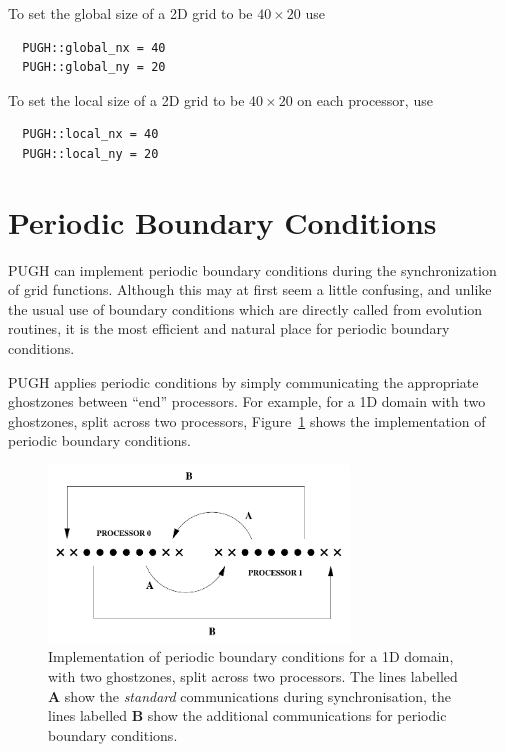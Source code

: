 \documentclass{article}
\begin{document}
To set the global size of a 2D grid to be $40\times 20$ use

\begin{verbatim}
  PUGH::global_nx = 40
  PUGH::global_ny = 20
\end{verbatim}

To set the local size of a 2D grid to be $40\times 20$ on each processor, use

\begin{verbatim}
  PUGH::local_nx = 40
  PUGH::local_ny = 20
\end{verbatim}


\section{Periodic Boundary Conditions}

PUGH can implement periodic boundary conditions during the synchronization
of grid functions. Although this may at first seem a little confusing, and
unlike the usual use of boundary conditions which are directly called from
evolution routines, it is the most efficient and natural place for periodic
boundary conditions.

PUGH applies periodic conditions by simply communicating the appropriate
ghostzones between ``end'' processors. For example, for a 1D domain with two
ghostzones, split across two processors, Figure~\ref{pugh::fig1} shows the implementation of periodic boundary conditions.

\begin{figure}[ht]
\begin{center}
\includegraphics[angle=0,width=8cm]{periodic}
\end{center}
\caption[]{Implementation of periodic boundary conditions for a 1D domain, with two ghostzones, split across two processors. The lines labelled {\bf A} show the {\it standard} communications during synchronisation, the lines labelled
{\bf B} show the additional communications for periodic boundary conditions.}
\label{pugh::fig1}
\end{figure}
\end{document}
